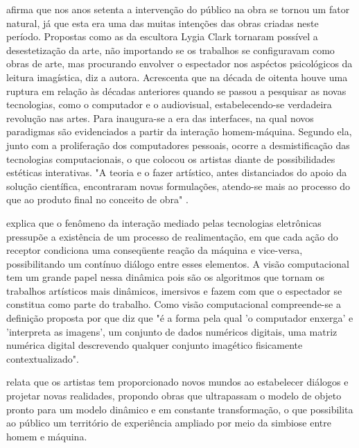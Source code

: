 afirma que nos anos setenta a intervenção do público na obra se tornou um fator natural, já que esta era uma das muitas intenções das obras criadas neste período. Propostas como as da escultora Lygia Clark tornaram possível a desestetização da arte, não importando se os trabalhos se configuravam como obras de arte, mas procurando envolver o espectador nos aspéctos psicológicos da leitura imagística, diz a autora. Acrescenta que na década de oitenta houve uma ruptura em relação às décadas anteriores quando se passou a pesquisar as novas tecnologias, como o computador e o audiovisual, estabelecendo-se verdadeira revolução nas artes. Para  inaugura-se a era das interfaces, na qual novos paradigmas são evidenciados a partir da interação homem-máquina. Segundo ela, junto com a proliferação dos computadores pessoais, ocorre a desmistificação das tecnologias computacionais, o que colocou os artistas diante de possibilidades estéticas interativas. "A teoria e o fazer artístico, antes distanciados do apoio da solução científica, encontraram novas formulações, atendo-se mais ao processo do que ao produto final no conceito de obra" \cite[p. 78]{rahde}.

 explica que o fenômeno da interação mediado pelas tecnologias eletrônicas pressupõe a existência de um processo de realimentação, em que cada ação do receptor condiciona uma conseqüente reação da máquina e vice-versa, possibilitando um contínuo diálogo entre esses elementos. A visão computacional tem um grande papel nessa dinâmica pois são os algoritmos que tornam os trabalhos artísticos mais dinâmicos, imersivos e fazem com que o espectador se constitua como parte do trabalho. Como visão computacional compreende-se a definição proposta por  que diz que "é a forma pela qual 'o computador enxerga' e 'interpreta as imagens', um conjunto de dados numéricos digitais, uma matriz numérica digital descrevendo qualquer conjunto imagético fisicamente contextualizado".

 relata que os artistas tem proporcionado novos mundos ao estabelecer diálogos e projetar novas realidades, propondo obras que ultrapassam o modelo de objeto pronto para um modelo dinâmico e em constante transformação, o que possibilita ao público um território de experiência ampliado por meio da simbiose entre homem e máquina.

